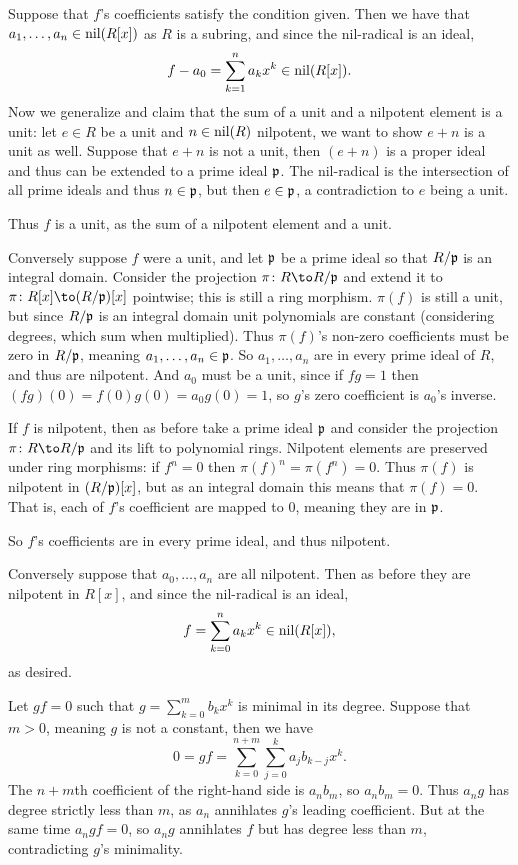 \benum
    \item Suppose that $f$'s coefficients satisfy the condition given.
    Then we have that $a_1,\dots,a_n\in{\rm nil}(R[x])$ as $R$ is a subring, and since the nil-radical is an ideal,
    $$ f - a_0 = \sum_{k=1}^n a_kx^k \in {\rm nil}(R[x]) . $$
    Now we generalize and claim that the sum of a unit and a nilpotent element is a unit: let $e\in R$ be a unit and $n\in{\rm nil}(R)$ nilpotent, we want to show $e+n$ is a unit as well.
    Suppose that $e+n$ is not a unit, then $(e+n)$ is a proper ideal and thus can be extended to a prime ideal ${{\frak p}}$.
    The nil-radical is the intersection of all prime ideals and thus $n\in{{\frak p}}$, but then $e\in{{\frak p}}$, a contradiction to $e$ being a unit.

    Thus $f$ is a unit, as the sum of a nilpotent element and a unit.

    Conversely suppose $f$ were a unit, and let ${{\frak p}}$ be a prime ideal so that $R/{{\frak p}}$ is an integral domain.
    Consider the projection $\pi\colon R\to R/\p$ and extend it to $\pi\colon R[x]\to(R/\p)[x]$ pointwise; this is still a ring morphism.
    $\pi(f)$ is still a unit, but since $R/{{\frak p}}$ is an integral domain unit polynomials are constant (considering degrees, which sum when multiplied).
    Thus $\pi(f)$'s non-zero coefficients must be zero in $R/{{\frak p}}$, meaning $a_1,\dots,a_n\in{{\frak p}}$.
    So $a_1,\dots,a_n$ are in every prime ideal of $R$, and thus are nilpotent.
    And $a_0$ must be a unit, since if $fg=1$ then $(fg)(0)=f(0)g(0)=a_0g(0)=1$, so $g$'s zero coefficient is $a_0$'s inverse.

    \item If $f$ is nilpotent, then as before take a prime ideal ${{\frak p}}$ and consider the projection $\pi\colon R\to R/\p$ and its lift to polynomial rings.
    Nilpotent elements are preserved under ring morphisms: if $f^n=0$ then $\pi(f)^n=\pi(f^n)=0$.
    Thus $\pi(f)$ is nilpotent in $(R/{{\frak p}})[x]$, but as an integral domain this means that $\pi(f)=0$.
    That is, each of $f$'s coefficient are mapped to $0$, meaning they are in ${{\frak p}}$.

    So $f$'s coefficients are in every prime ideal, and thus nilpotent.

    Conversely suppose that $a_0,\dots,a_n$ are all nilpotent.
    Then as before they are nilpotent in $R[x]$, and since the nil-radical is an ideal,
    $$ f = \sum_{k=0}^n a_kx^k \in {\rm nil}(R[x]) , $$
    as desired.

    \item Let $gf=0$ such that $g=\sum_{k=0}^mb_kx^k$ is minimal in its degree.
    Suppose that $m>0$, meaning $g$ is not a constant, then we have
    $$ 0 = gf = \sum_{k=0}^{n+m}\sum_{j=0}^k a_jb_{k-j}x^k . $$
    The $n+m$th coefficient of the right-hand side is $a_nb_m$, so $a_nb_m=0$.
    Thus $a_ng$ has degree strictly less than $m$, as $a_n$ annihlates $g$'s leading coefficient.
    But at the same time $a_ngf=0$, so $a_ng$ annihlates $f$ but has degree less than $m$, contradicting $g$'s minimality.


